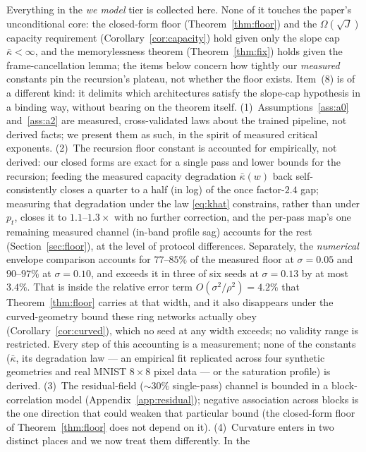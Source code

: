 \documentclass[11pt]{article}
\theoremstyle{remark}
\newcommand{\kb}{\bar\kappa}
\newcommand{\sigsq}{\sigma^2}
\begin{document}
Everything in the \emph{we model} tier is collected here. None of it touches the paper's
unconditional core: the closed-form floor (Theorem~\ref{thm:floor}) and the
$\Omega(\sqrt J)$ capacity requirement (Corollary~\ref{cor:capacity}) hold given only the
slope cap $\kb<\infty$, and the memorylessness theorem (Theorem~\ref{thm:fix}) holds given
the frame-cancellation lemma; the items below concern how tightly our \emph{measured}
constants pin the recursion's plateau, not whether the floor exists. Item~(8) is of a
different kind: it delimits which architectures satisfy the slope-cap hypothesis in a
binding way, without bearing on the theorem itself.
(1)~Assumptions~\ref{ass:a0} and~\ref{ass:a2} are measured, cross-validated laws about the
trained pipeline, not derived facts; we present them as such, in the spirit of measured
critical exponents.
(2)~The recursion floor constant is accounted for empirically, not derived: our closed
forms are exact for a single pass and lower bounds for the recursion; feeding the
measured capacity degradation $\kb(w)$ back self-consistently closes a quarter to a
half (in log) of the once factor-$2.4$ gap; measuring that degradation under the law
\eqref{eq:khat} constrains, rather than under $p_t$, closes it to $1.1$--$1.3\times$ with
no further correction, and the per-pass map's one remaining measured channel (in-band
profile sag) accounts for the rest (Section~\ref{sec:floor}), at the level of protocol
differences. Separately, the \emph{numerical} envelope comparison accounts for $77$--$85\%$
of the measured floor at $\sigma=0.05$ and $90$--$97\%$ at $\sigma=0.10$, and exceeds it in
three of six seeds at $\sigma=0.13$ by at most $3.4\%$. That is inside the relative error term
$O(\sigsq/\rho^2)=4.2\%$ that Theorem~\ref{thm:floor} carries at that width, and it also
disappears under the curved-geometry bound these ring networks actually obey
(Corollary~\ref{cor:curved}), which no seed at any width exceeds; no validity range is
restricted. Every
step of this accounting is a measurement; none of the constants ($\kb$, its
degradation law --- an empirical fit replicated across four synthetic geometries and
real MNIST $8\times8$ pixel data --- or the saturation profile) is derived.
(3)~The residual-field ($\sim30\%$ single-pass) channel is bounded in a
block-correlation model (Appendix~\ref{app:residual}); negative association across
blocks is the one direction that could weaken that particular bound (the closed-form
floor of Theorem~\ref{thm:floor} does not depend on it).
(4)~Curvature enters in two distinct places and we now treat them differently. In the
\end{document}
